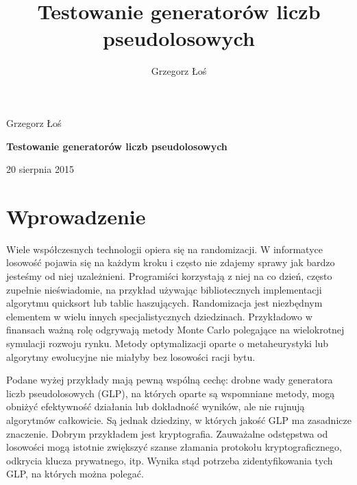 \documentclass[a4paper,11pt,oneside]{book}
\theoremstyle{definition}
\begin{document}
\author{Grzegorz Łoś}
\title{Testowanie generatorów liczb pseudolosowych}

\begin{center}
\begin{Large}Grzegorz Łoś\end{Large}

\begin{huge}\textbf{Testowanie generatorów liczb pseudolosowych} \end{huge}

\begin{Large}20 sierpnia 2015\end{Large}

\end{center}



\begin{minipage}{0.8\linewidth}
\tableofcontents
\end{minipage}

\chapter*{Wprowadzenie}
Wiele współczesnych technologii opiera się na randomizacji. W informatyce losowość pojawia się na każdym kroku i często nie zdajemy sprawy jak bardzo jesteśmy od niej uzależnieni. Programiści korzystają z niej na co dzień, często zupełnie nieświadomie, na przykład używając bibliotecznych implementacji algorytmu quicksort lub tablic haszujących. Randomizacja jest niezbędnym elementem w wielu innych specjalistycznych dziedzinach. Przykładowo w finansach ważną rolę odgrywają metody Monte Carlo polegające na wielokrotnej symulacji rozwoju rynku. Metody optymalizacji oparte o metaheurystyki lub algorytmy ewolucyjne nie miałyby bez losowości racji bytu.

Podane wyżej przykłady mają pewną wspólną cechę: drobne wady generatora liczb pseudolosowych (GLP), na których oparte są wspomniane metody, mogą obniżyć efektywność działania lub dokładność wyników, ale nie rujnują algorytmów całkowicie. Są jednak dziedziny, w których jakość GLP ma zasadnicze znaczenie. Dobrym przykładem jest kryptografia. Zauważalne odstępstwa od losowości mogą istotnie zwiększyć szanse złamania protokołu kryptograficznego, odkrycia klucza prywatnego, itp. Wynika stąd potrzeba zidentyfikowania tych GLP, na których można polegać.
\end{document}

